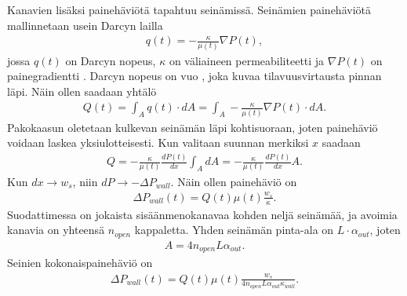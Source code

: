 Kanavien lisäksi painehäviötä tapahtuu seinämissä. Seinämien painehäviötä mallinnetaan usein Darcyn lailla \cite{dieselnet_wall_flow_monolith}\cite{Konstandopoulos1989_wallflow}
\begin{align}
    q(t) = - \frac{\kappa}{\mu(t)}\nabla P(t),
\end{align}
jossa \(q(t)\) on Darcyn nopeus, \(\kappa\) on väliaineen permeabiliteetti ja \(\nabla P(t)\) on painegradientti \cite{feder2021_porous}. 
 Darcyn nopeus on vuo \cite{reible_env_eng}, joka kuvaa tilavuusvirtausta pinnan läpi. Näin ollen saadaan yhtälö
\begin{align}
    Q(t) = \int_A q(t) \cdot dA = \int_A - \frac{\kappa}{\mu(t)} \nabla P(t) \cdot dA.
\end{align}
Pakokaasun oletetaan kulkevan seinämän läpi kohtisuoraan, joten painehäviö voidaan laskea yksiulotteisesti. Kun valitaan suunnan merkiksi \(x\) saadaan
\begin{align}
    Q = - \frac{\kappa}{\mu(t)} \frac{dP(t)}{dx} \int_A dA = - \frac{\kappa}{\mu(t)} \frac{dP(t)}{dx} A.
\end{align}
Kun \(dx \to w_s\), niin \(dP \to -\Delta P_{wall}\). Näin ollen painehäviö on
\begin{align}
    \Delta P_{wall}(t) = Q(t)\mu(t) \frac{w_s}{\kappa}.
\end{align}
Suodattimessa on jokaista sisäänmenokanavaa kohden neljä seinämää, ja avoimia kanavia on yhteensä \(n_{open}\) kappaletta. Yhden seinämän pinta-ala on \(L\cdot \alpha_{out}\), joten 
\begin{align}
    A = 4 n_{open} L \alpha_{out}.
\end{align}
Seinien kokonaispainehäviö on
\begin{align}
    \Delta P_{wall}(t) =  Q(t) \mu(t) \frac{w_s}{4 n_{open} L  \alpha_{out}  \kappa_{wall}}.
\end{align}

